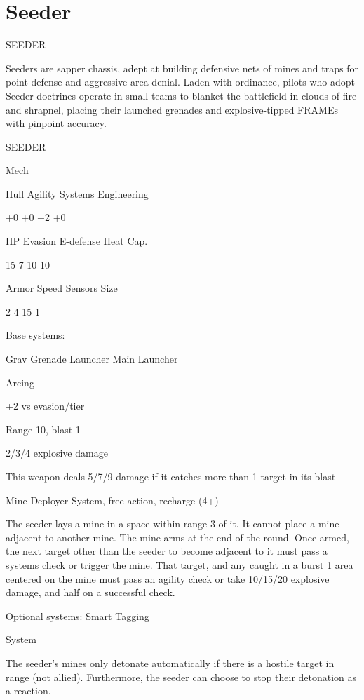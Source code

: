 \section{Seeder}

                                                SEEDER  

Seeders are sapper chassis, adept at building defensive nets of mines and traps for point defense  
and aggressive area denial. Laden with ordinance, pilots who adopt Seeder doctrines operate in  
small teams to blanket the battlefield in clouds of fire and shrapnel, placing their launched  
grenades and explosive-tipped FRAMEs with pinpoint accuracy. 
 

 SEEDER 

 Mech 

 Hull       Agility      Systems       Engineering 

 +0         +0           +2            +0 

 HP         Evasion      E-defense     Heat Cap. 

 15         7            10            10 

 Armor      Speed        Sensors       Size 

 2          4            15            1 

Base systems:
 
Grav Grenade Launcher  
Main Launcher
 
Arcing
 
+2 vs evasion/tier
 
Range 10, blast 1
 
2/3/4 explosive damage
 
This weapon deals 5/7/9 damage if it catches more than 1 target in its blast
 

Mine Deployer  
System, free action, recharge (4+)
 
The seeder lays a mine in a space within range 3 of it. It cannot place a mine adjacent to another  
mine. The mine arms at the end of the round. Once armed, the next target other than the seeder  
to become adjacent to it must pass a systems check or trigger the mine. That target, and any  
caught in a burst 1 area centered on the mine must pass an agility check or take 10/15/20  
explosive damage, and half on a successful check.
 

Optional systems:  
Smart Tagging
 
System
 
The seeder’s mines only detonate automatically if there is a hostile target in range (not allied).  
Furthermore, the seeder can choose to stop their detonation as a reaction.
 

